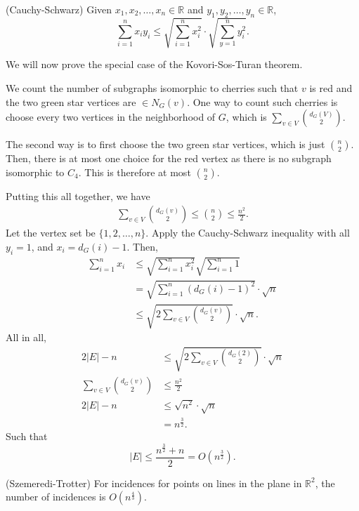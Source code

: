 
\begin{theorem}
	(Cauchy-Schwarz) Given \( x_{1}, x_{2}, \ldots  ,x_n \in \mathbb{R}  \) and \( y_{1}, y_{2}, \ldots , y_n \in \mathbb{R} \), \[
		\sum_{i=1}^{n}x_iy_i \le \sqrt{\sum_{i=1}^{n} x_{i}^{2} } \cdot \sqrt{\sum_{y=1}^{n} y_{i}^{2} } 
	.\] 
\end{theorem}

We will now prove the special case of the Kovori-Sos-Turan theorem.

\begin{replacementproof}
	We count the number of subgraphs isomorphic to cherries such that \( v \) is red and the two green star vertices are \( \in N_G(v) \). One way to count such cherries is choose every two vertices in the neighborhood of \( G \), which is \( \sum_{v \in V} \binom{d_G(V)}{2} \).

	The second way is to first choose the two green star vertices, which is just \( \binom{n}{2} \). Then, there is at most one choice for the red vertex as there is no subgraph isomorphic to \( C_4 \). This is therefore at most \( \binom{n}{2} \).

	Putting this all together, we have 
	\begin{align*}
		\sum_{v \in V}\binom{d_G(v)}{2} \le \binom{n}{2} \le \frac{n^{2}}{2}
	.\end{align*}
	Let the vertex set be \( \{1, 2, \ldots , n\}   \). Apply the Cauchy-Schwarz inequality with all \( y_{i}=1 \), and \( x_i = d_G(i) - 1 \). Then, 
	\begin{align*}
		\sum_{i=1}^{n} x_i &\le  \sqrt{\sum_{i=1}^{n} x_i^{2} } \sqrt{\sum_{i=1}^{n} 1} \\
		&= \sqrt{\sum_{i=1}^{n} (d_G(i) - 1)^{2} } \cdot \sqrt{n}   \\
		&\le \sqrt{ 2 \sum_{v  \in V} \binom{d_G(v)}{2}} \cdot \sqrt{n}
	.\end{align*}
	All in all, 
	\begin{align*}
		2|E|-n &\le \sqrt{2 \sum_{v \in V}\binom{d_G(2)}{2}} \cdot \sqrt{n} \\
	  \sum_{v \in V}\binom{d_G(v)}{2} &\le  \frac{n^2}{2}\\
		2|E|-n &\le \sqrt{n^{2} }  \cdot \sqrt{n} \\
		&= n^{\frac{3}{2}}
	.\end{align*}
	Such that \[
		|E| \le \frac{n^{\frac{3}{2}}+n }{2} = O(n^{\frac{3}{2}} )
	.\] 
\end{replacementproof}

\begin{theorem}
	(Szemeredi-Trotter) For incidences for points on lines in the plane in \( \mathbb{R}^{2}  \), the number of incidences is \( O(n^{\frac{4}{3}} ) \).
\end{theorem}

